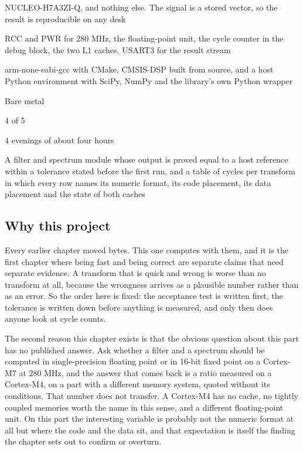 
\begin{keyfacts}
\item[Board] NUCLEO-H7A3ZI-Q, and nothing else. The signal is a stored vector, so the result is reproducible on any desk
\item[Peripherals] RCC and PWR for 280 MHz, the floating-point unit, the cycle counter in the debug block, the two L1 caches, USART3 for the result stream
\item[Toolchain] arm-none-eabi-gcc with CMake, CMSIS-DSP built from source, and a host Python environment with SciPy, NumPy and the library's own Python wrapper
\item[Operating system] Bare metal
\item[Difficulty] 4 of 5
\item[Effort] 4 evenings of about four hours
\item[Deliverable] A filter and spectrum module whose output is proved equal to a host reference within a tolerance stated before the first run, and a table of cycles per transform in which every row names its numeric format, its code placement, its data placement and the state of both caches
\end{keyfacts}

\subsection*{Why this project}

Every earlier chapter moved bytes. This one computes with them, and it is the
first chapter where being fast and being correct are separate claims that need
separate evidence. A transform that is quick and wrong is worse than no
transform at all, because the wrongness arrives as a plausible number rather
than as an error. So the order here is fixed: the acceptance test is written
first, the tolerance is written down before anything is measured, and only then
does anyone look at cycle counts.

The second reason this chapter exists is that the obvious question about this
part has no published answer. Ask whether a filter and a spectrum should be
computed in single-precision floating point or in 16-bit fixed point on a
Cortex-M7 at 280 MHz, and the answer that comes back is a ratio measured on a
Cortex-M4, on a part with a different memory system, quoted without its
conditions. That number does not transfer. A Cortex-M4 has no cache, no
tightly coupled memories worth the name in this sense, and a different
floating-point unit. On this part the interesting variable is probably not the
numeric format at all but where the code and the data sit, and that expectation
is itself the finding the chapter sets out to confirm or overturn.

